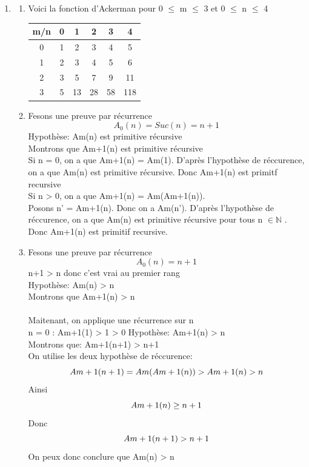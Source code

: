 \documentclass[]{article}
\begin{document}
\begin{enumerate}
\begin{enumerate}
\end{enumerate}
\item \begin{enumerate} 

\item Voici la fonction d'Ackerman pour 0 $\le$ m $\le$ 3 et 0 $\le$ n $\le$ 4 \\
\begin{center}
\begin{tabular}{| c || c | c | c | c | c |}
\hline
m/n & 0 & 1 & 2 & 3 & 4 \\
\hline
\hline
0 & 1 & 2 & 3 & 4 & 5 \\
\hline
1 & 2 & 3 & 4 & 5 & 6 \\
\hline
2 & 3 & 5 & 7 & 9 & 11 \\
\hline
3 & 5 & 13 & 28 & 58 & 118 \\
\hline
\end{tabular}
\end{center}

\item Fesons une preuve par récurrence
\[A_0(n) = Suc(n) = n + 1\]
Hypothèse: A\tiny m\normalsize (n) est primitive récursive\\
Montrons que A\tiny m+1\normalsize (n) est primitive récursive\\ 

Si n = 0, on a que A\tiny m+1\normalsize (n) = A\tiny m\normalsize (1). D'après l'hypothèse de réccurence, on a que A\tiny m\normalsize (n) est primitive récursive. Donc A\tiny m+1\normalsize (n) est primitf recursive\\

Si n > 0, on a que A\tiny m+1\normalsize (n) = A\tiny m\normalsize (A\tiny m+1\normalsize (n)).\\
Posons n' = A\tiny m+1\normalsize (n). Donc on a A\tiny m\normalsize (n'). D'après l'hypothèse de réccurence, on a que A\tiny m\normalsize (n) est primitive récursive pour tous n $\in \mathbb{N}$ . Donc A\tiny m+1\normalsize (n) est primitif recursive.\\

\item 
Fesons une preuve par récurrence 
\[A_0(n) = n+1 \] 
n+1 > n donc c'est vrai au premier rang\\
Hypothèse: A\tiny m\normalsize (n) > n \\
Montrons que A\tiny m+1\normalsize (n) > n\\ \\
Maitenant, on applique une récurrence sur n\\
n = 0 : A\tiny m+1\normalsize (1) > 1  > 0
Hypothèse: A\tiny m+1\normalsize (n) > n \\
Montrons que: A\tiny m+1\normalsize (n+1) > n+1\\
On utilise les deux hypothèse de réccurence:\\
\[A\tiny m+1\normalsize (n+1) = A\tiny m\normalsize (A\tiny m+1\normalsize (n)) > A\tiny m+1\normalsize (n) > n \]
Ainsi \[A\tiny m+1\normalsize (n) \ge n+1\]
Donc \[A\tiny m+1\normalsize (n+1) > n+1\]
On peux donc conclure que A\tiny m\normalsize (n) > n\\


\end{enumerate}
\end{enumerate}
\end{document}
